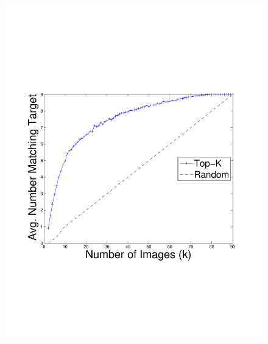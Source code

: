 \begin{figure}
{        \includegraphics[clip=true, trim = 17mm 65mm 25mm 70mm, scale=0.23]{figures/topk/avg_num_matching_color.pdf}
        \label{fig:topkAvgNumSameSet}
        }
\end{figure}
